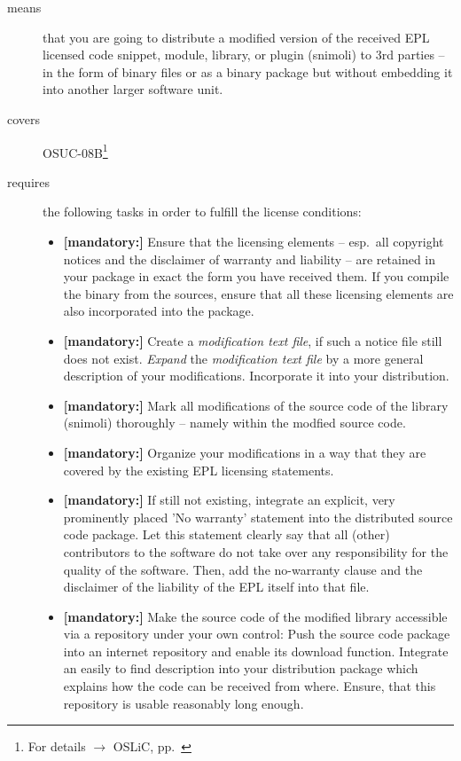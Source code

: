 \begin{description}
\item[means] that you are going to distribute a modified version of the received
EPL licensed code snippet, module, library, or plugin (snimoli) to 3rd parties
-- in the form of binary files or as a binary package but without embedding it
into another larger software unit.
\item[covers] OSUC-08B\footnote{For details $\rightarrow$ OSLiC, pp.\
\pageref{OSUC-08B-DEF}}
\item[requires] the following tasks in order to fulfill the license conditions:
\begin{itemize}

  \item \textbf{[mandatory:]} Ensure that the licensing elements -- esp.\ all
  copyright notices and the disclaimer of warranty and liability -- are retained
  in your package in exact the form you have received them. If you compile the
  binary from the sources, ensure that all these licensing elements are also
  incorporated into the package.

  \item \textbf{[mandatory:]} Create a \emph{modification text file}, if such a
  notice file still does not exist. \emph{Expand} the \emph{modification text
  file} by a more general description of your modifications. Incorporate it into
  your distribution.

  \item \textbf{[mandatory:]} Mark all modifications of the source code of the
  library (snimoli) thoroughly -- namely within the modfied source code.

  \item \textbf{[mandatory:]} Organize your modifications in a way that they are
  covered by the existing EPL licensing statements.
  
  \item \textbf{[mandatory:]} If still not existing, integrate an explicit, very
  prominently placed 'No warranty' statement into the distributed source code
  package. Let this statement clearly say that all (other) contributors to the
  software do not take over any responsibility for the quality of the software.
  Then, add the no-warranty clause and the disclaimer of the liability of the
  EPL itself into that file.
  
  \item \textbf{[mandatory:]} Make the source code of the modified library
  accessible via a repository under your own control: Push the source code
  package into an internet repository and enable its download function.
  Integrate an easily to find description into your distribution package which
  explains how the code can be received from where. Ensure, that this repository
  is usable reasonably long enough.
  

\end{itemize}
\end{description}

